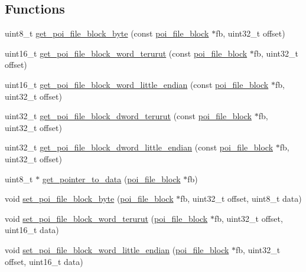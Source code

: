 \subsection*{Functions}
\begin{DoxyCompactItemize}
\item 
uint8\-\_\-t \hyperlink{file-manager_8c_aa7ddf45147d5fd749f48262bfa3f7596}{get\-\_\-poi\-\_\-file\-\_\-block\-\_\-byte} (const \hyperlink{structpoi__file__block}{poi\-\_\-file\-\_\-block} $\ast$fb, uint32\-\_\-t offset)
\item 
uint16\-\_\-t \hyperlink{file-manager_8c_aa1b3406849e894d98c44ac9eaeb5fe4c}{get\-\_\-poi\-\_\-file\-\_\-block\-\_\-word\-\_\-terurut} (const \hyperlink{structpoi__file__block}{poi\-\_\-file\-\_\-block} $\ast$fb, uint32\-\_\-t offset)
\item 
uint16\-\_\-t \hyperlink{file-manager_8c_ab2141a18a18420ac6e71f85341fda8ba}{get\-\_\-poi\-\_\-file\-\_\-block\-\_\-word\-\_\-little\-\_\-endian} (const \hyperlink{structpoi__file__block}{poi\-\_\-file\-\_\-block} $\ast$fb, uint32\-\_\-t offset)
\item 
uint32\-\_\-t \hyperlink{file-manager_8c_a013cf45a7073cdb61f54758f4271100f}{get\-\_\-poi\-\_\-file\-\_\-block\-\_\-dword\-\_\-terurut} (const \hyperlink{structpoi__file__block}{poi\-\_\-file\-\_\-block} $\ast$fb, uint32\-\_\-t offset)
\item 
uint32\-\_\-t \hyperlink{file-manager_8c_a9b3a4e41531820c25e3d2d9019c39cba}{get\-\_\-poi\-\_\-file\-\_\-block\-\_\-dword\-\_\-little\-\_\-endian} (const \hyperlink{structpoi__file__block}{poi\-\_\-file\-\_\-block} $\ast$fb, uint32\-\_\-t offset)
\item 
uint8\-\_\-t $\ast$ \hyperlink{file-manager_8c_a1620d168cca553a51e54bc807ded7d70}{get\-\_\-pointer\-\_\-to\-\_\-data} (\hyperlink{structpoi__file__block}{poi\-\_\-file\-\_\-block} $\ast$fb)
\item 
void \hyperlink{file-manager_8c_ae7dadc1287f969a24815c62ad80f4d08}{set\-\_\-poi\-\_\-file\-\_\-block\-\_\-byte} (\hyperlink{structpoi__file__block}{poi\-\_\-file\-\_\-block} $\ast$fb, uint32\-\_\-t offset, uint8\-\_\-t data)
\item 
void \hyperlink{file-manager_8c_a871a513295bd0a2c63e531d17cb23c54}{set\-\_\-poi\-\_\-file\-\_\-block\-\_\-word\-\_\-terurut} (\hyperlink{structpoi__file__block}{poi\-\_\-file\-\_\-block} $\ast$fb, uint32\-\_\-t offset, uint16\-\_\-t data)
\item 
void \hyperlink{file-manager_8c_a8af78372c29561516b35df699039b85f}{set\-\_\-poi\-\_\-file\-\_\-block\-\_\-word\-\_\-little\-\_\-endian} (\hyperlink{structpoi__file__block}{poi\-\_\-file\-\_\-block} $\ast$fb, uint32\-\_\-t offset, uint16\-\_\-t data)

\end{DoxyCompactItemize}
